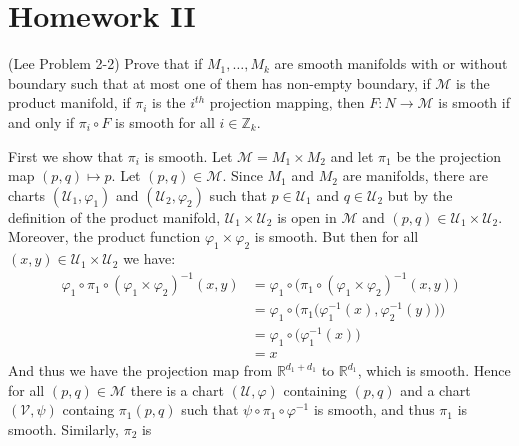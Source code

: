 \section{Homework II}
    \begin{problem}
        (Lee Problem 2-2) Prove that if $M_{1},\dots,M_{k}$ are smooth
        manifolds with or without boundary such that at most one of them has
        non-empty boundary, if $\mathcal{M}$ is the product manifold, if
        $\pi_{i}$ is the $i^{th}$ projection mapping, then
        $F:N\rightarrow\mathcal{M}$ is smooth if and only if
        $\pi_{i}\circ{F}$ is smooth for all $i\in\mathbb{Z}_{k}$.
    \end{problem}
    \begin{solution}
        First we show that $\pi_{i}$ is smooth. Let
        $\mathcal{M}=M_{1}\times{M}_{2}$ and let $\pi_{1}$ be the projection
        map $(p,q)\mapsto{p}$. Let $(p,q)\in\mathcal{M}$. Since
        $M_{1}$ and $M_{2}$ are manifolds, there are charts
        $(\mathcal{U}_{1},\varphi_{1})$ and $(\mathcal{U}_{2},\varphi_{2})$
        such that $p\in\mathcal{U}_{1}$ and $q\in\mathcal{U}_{2}$ but by the
        definition of the product manifold,
        $\mathcal{U}_{1}\times\mathcal{U}_{2}$ is open in $\mathcal{M}$ and
        $(p,q)\in\mathcal{U}_{1}\times\mathcal{U}_{2}$. Moreover, the
        product function $\varphi_{1}\times\varphi_{2}$ is smooth. But then
        for all $(x,y)\in\mathcal{U}_{1}\times\mathcal{U}_{2}$ we have:
        \begin{align}
            \varphi_{1}\circ\pi_{1}\circ
                (\varphi_{1}\times\varphi_{2})^{\minus{1}}(x,y)
            &=\varphi_{1}\circ\big(
                \pi_{1}\circ(\varphi_{1}\times\varphi_{2})^{\minus{1}}(x,y)
            \big)\\
            &=\varphi_{1}\circ\Big(
                \pi_{1}\big(\varphi_{1}^{\minus{1}}(x),
                            \varphi_{2}^{\minus{1}}(y)\big)\Big)\\
            &=\varphi_{1}\circ\big(\varphi_{1}^{\minus{1}}(x)\big)\\
            &=x
        \end{align}
        And thus we have the projection map from $\mathbb{R}^{d_{1}+d_{1}}$
        to $\mathbb{R}^{d_{1}}$, which is smooth. Hence for all
        $(p,q)\in\mathcal{M}$ there is a chart $(\mathcal{U},\varphi)$
        containing $(p,q)$ and a chart $(\mathcal{V},\psi)$ containg
        $\pi_{1}(p,q)$ such that $\psi\circ\pi_{1}\circ\varphi^{\minus{1}}$
        is smooth, and thus $\pi_{1}$ is smooth. Similarly, $\pi_{2}$ is

\end{solution}
